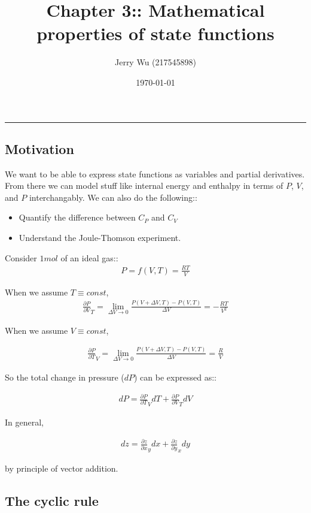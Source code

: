 \documentclass[12pt]{article}
\title{Chapter 3:: Mathematical properties of state functions}
\author{Jerry Wu (217545898)}
\date{\today}
\begin{document}
\maketitle
\rule{\textwidth}{0.4pt}

\subsection*{Motivation}
We want to be able to express state functions as variables and partial derivatives. From there we can model stuff like internal energy and enthalpy in terms of $P$, $V$, and $P$ interchangably. We can also do the following::

\begin{itemize}
    \item Quantify the difference between $C_P$ and $C_V$
    \item Understand the Joule-Thomson experiment.
\end{itemize}

Consider $1mol$ of an ideal gas::
\begin{align*}
    P=f(V,T)=\frac{RT}{V}
\end{align*}

When we assume $T\equiv const$,
\begin{align*}
    \frac{\partial P}{\partial V}_T=\lim_{\Delta V\rightarrow 0}\frac{P(V+\Delta V,T)-P(V,T)}{\Delta V}=-\frac{RT}{V^2}
\end{align*}

When we assume $V\equiv const$,

\begin{align*}
    \frac{\partial P}{\partial T}_V=\lim_{\Delta V\rightarrow 0}\frac{P(V+\Delta V,T)-P(V,T)}{\Delta V}=\frac{R}{V}
\end{align*}

So the total change in pressure ($dP$) can be expressed as::

\begin{align*}
    dP=\frac{\partial P}{\partial T}_V dT+\frac{\partial P}{\partial V}_T dV
\end{align*}

In general, 

\begin{align*}
    dz=\frac{\partial z}{\partial x}_y dx + \frac{\partial z}{\partial y}_x dy
\end{align*}

by principle of vector addition.

\subsection*{The cyclic rule}
\end{document}
